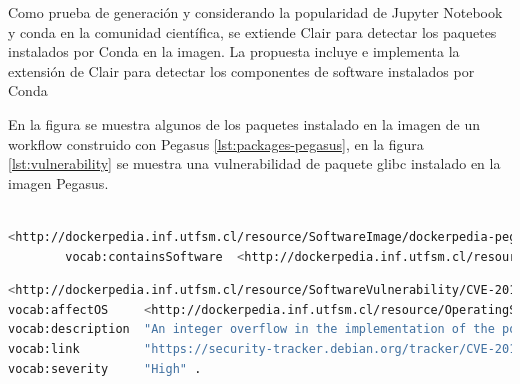Como prueba de generación y considerando la popularidad de Jupyter Notebook y conda en la comunidad científica, se extiende Clair para detectar los paquetes instalados por Conda en la imagen. La propuesta incluye e implementa la extensión de Clair para detectar los componentes de software instalados por Conda

En la figura se muestra algunos de los paquetes instalado en la imagen de un workflow construido con Pegasus \ref{lst:packages-pegasus}, en la figura \ref{lst:vulnerability} se muestra una vulnerabilidad de paquete glibc instalado en la imagen Pegasus.
\begin{lstlisting}[caption={Ejemplo de triples que muestran los componentes de software de la imagen Pegasus},label={lst:packages-pegasus},language=bash]

<http://dockerpedia.inf.utfsm.cl/resource/SoftwareImage/dockerpedia-pegasus_workflow_images%3Apegasus-4.8.5>
        vocab:containsSoftware  <http://dockerpedia.inf.utfsm.cl/resource/PackageVersion/libxcb-1.11.1-1ubuntu1>, <http://dockerpedia.inf.utfsm.cl/resource/PackageVersion/cryptsetup-2%3A1.6.6-5ubuntu2.1> , <http://dockerpedia.inf.utfsm.cl/resource/PackageVersion/e2fsprogs-1.42.13-1ubuntu1> , <http://dockerpedia.inf.utfsm.cl/resource/PackageVersion/dbus-glib-0.106-1> , <http://dockerpedia.inf.utfsm.cl/resource/PackageVersion/libxmu-2%3A1.1.2-2>
\end{lstlisting}

\begin{lstlisting}[caption={Ejemplo de triples de la vulnerabilidad de glibc},label={lst:vulnerability},language=bash]
<http://dockerpedia.inf.utfsm.cl/resource/SoftwareVulnerability/CVE-2018-6485>
vocab:affectOS     <http://dockerpedia.inf.utfsm.cl/resource/OperatingSystem/ubuntu%3A16.04> , <http://dockerpedia.inf.utfsm.cl/resource/OperatingSystem/debian%3A9> ;
vocab:description  "An integer overflow in the implementation of the posix_memalign in memalign functions in the GNU C Library (aka glibc or libc6) 2.26 and earlier could cause these functions to return a pointer to a heap area that is too small, potentially leading to heap corruption." ;
vocab:link         "https://security-tracker.debian.org/tracker/CVE-2018-6485" , "http://people.ubuntu.com/~ubuntu-security/cve/CVE-2018-6485" ;
vocab:severity     "High" .
\end{lstlisting}
